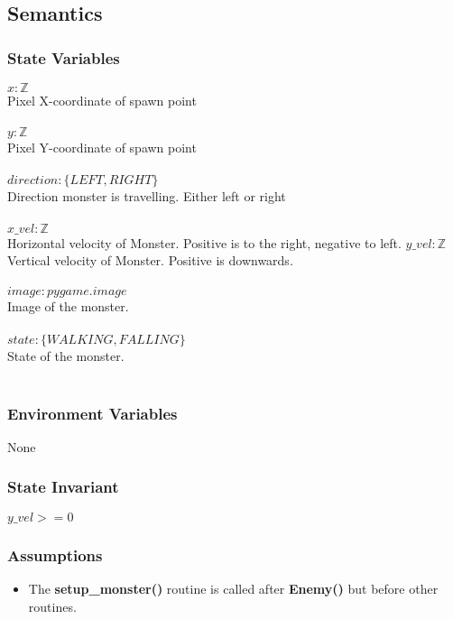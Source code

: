 \documentclass[12pt]{article}
\begin{document}
\subsection* {Semantics}

\subsubsection* {State Variables}

$x: \mathbb{Z}$\\
Pixel X-coordinate of spawn point\\\\
$y: \mathbb{Z}$\\
Pixel Y-coordinate of spawn point\\\\
$direction: \{LEFT,RIGHT\}$\\
Direction monster is travelling. Either left or right \\\\
$x\_vel: \mathbb{Z}$ \\
Horizontal velocity of Monster. Positive is to the right, negative to left.
$y\_vel: \mathbb{Z}$ \\
Vertical velocity of Monster. Positive is downwards.\\\\
$image: pygame.image$\\
Image of the monster.\\\\
$state: \{WALKING, FALLING\}$\\
State of the monster.\\\\


\subsubsection* {Environment Variables}
None
\subsubsection* {State Invariant}
$y\_vel >= 0$\\
\subsubsection* {Assumptions}
\begin{itemize}
\item The \textbf{setup\_monster()} routine is called after \textbf{Enemy()} but before other routines.
\end{itemize}
\end{document}
